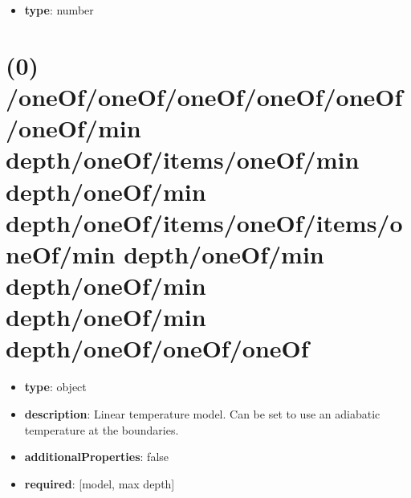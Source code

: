 \begin{itemize}[leftmargin=3em]\item {\bf type}: number
\end{itemize}\section{(0) /oneOf/oneOf/oneOf/oneOf/oneOf/oneOf/min depth/oneOf/items/oneOf/min depth/oneOf/min depth/oneOf/items/oneOf/items/oneOf/min depth/oneOf/min depth/oneOf/min depth/oneOf/min depth/oneOf/oneOf/oneOf}
\begin{itemize}[leftmargin=0em]\item {\bf type}: object
\item {\bf description}: Linear temperature model. Can be set to use an adiabatic temperature at the boundaries.
\item {\bf additionalProperties}: false
\item {\bf required}: [model, max depth]\end{itemize}

